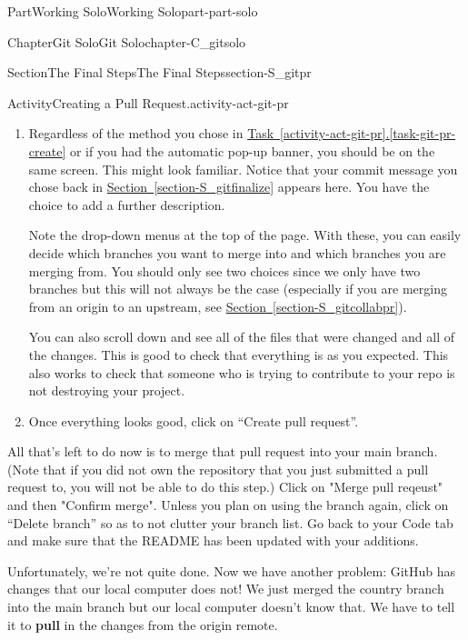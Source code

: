 \documentclass[oneside,10pt,]{book}
\newcommand{\xreffont}{\relax}
\newcommand{\terminology}[1]{\textbf{#1}}
\begin{document}
\begin{partptx}{Part}{Working Solo}{}{Working Solo}{}{}{part-part-solo}
\begin{chapterptx}{Chapter}{Git Solo}{}{Git Solo}{}{}{chapter-C_gitsolo}
\begin{sectionptx}{Section}{The Final Steps}{}{The Final Steps}{}{}{section-S_gitpr}
\begin{activity}{Activity}{Creating a Pull Request.}{activity-act-git-pr}
\begin{enumerate}[font=\bfseries,label=(\alph*),ref=\alph*]
\begin{enumerate}
\item{}Navigate to the Pull requests tab. Click on the green button near the top right that says ``New pull request''. Select the branch you want to pull into main from either the ``Compare'' drop-down menu at the top or the example comparisons table. Click ``Create pull request''.%
\end{enumerate}
%
\item\label{task-git-pr-open}Regardless of the method you chose in \hyperref[task-git-pr-create]{Task~{\xreffont\ref{activity-act-git-pr}}.{\xreffont\ref{task-git-pr-create}}} or if you had the automatic pop-up banner, you should be on the same screen. This might look familiar. Notice that your commit message you chose back in \hyperref[section-S_gitfinalize]{Section~{\xreffont\ref{section-S_gitfinalize}}} appears here. You have the choice to add a further description.%
\par
Note the drop-down menus at the top of the page. With these, you can easily decide which branches you want to merge into and which branches you are merging from. You should only see two choices since we only have two branches but this will not always be the case (especially if you are merging from an origin to an upstream, see \hyperref[section-S_gitcollabpr]{Section~{\xreffont\ref{section-S_gitcollabpr}}}).%
\par
You can also scroll down and see all of the files that were changed and all of the changes. This is good to check that everything is as you expected. This also works to check that someone who is trying to contribute to your repo is not destroying your project.%
\item{}Once everything looks good, click on ``Create pull request''.%
\end{enumerate}%
All that's left to do now is to merge that pull request into your main branch. (Note that if you did not own the repository that you just submitted a pull request to, you will not be able to do this step.) Click on "Merge pull reqeust" and then "Confirm merge". Unless you plan on using the branch again, click on ``Delete branch'' so as to not clutter your branch list. Go back to your Code tab and make sure that the README has been updated with your additions.%
\end{activity}%
 Unfortunately, we're not quite done. Now we have another problem: GitHub has changes that our local computer does not! We just merged the country branch into the main branch but our local computer doesn't know that. We have to tell it to \terminology{pull} in the changes from the origin remote.%

\end{sectionptx}
\end{chapterptx}
\end{partptx}
\end{document}
